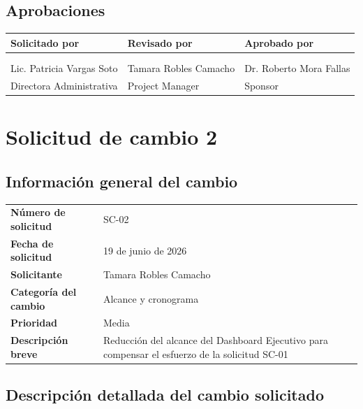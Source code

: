 \documentclass[11pt,spanish]{article}
\begin{document}
\subsection{Aprobaciones}

\begin{table}[H]
\centering
\begin{tabularx}{\textwidth}{Y Y Y}
\toprule
\textbf{Solicitado por} & \textbf{Revisado por} & \textbf{Aprobado por} \\
\midrule
& & \\
& & \\
Lic. Patricia Vargas Soto & Tamara Robles Camacho & Dr. Roberto Mora Fallas \\
Directora Administrativa & Project Manager & Sponsor \\
\bottomrule
\end{tabularx}
\end{table}

\newpage
\section{Solicitud de cambio 2}

\subsection{Información general del cambio}

\begin{table}[H]
\centering
\begin{tabularx}{\textwidth}{p{5cm} Y}
\toprule
\textbf{Número de solicitud} & SC-02 \\
\textbf{Fecha de solicitud} & 19 de junio de 2026 \\
\textbf{Solicitante} & Tamara Robles Camacho \\
\textbf{Categoría del cambio} & Alcance y cronograma \\
\textbf{Prioridad} & Media \\
\textbf{Descripción breve} & Reducción del alcance del Dashboard Ejecutivo para compensar el esfuerzo de la solicitud SC-01 \\
\bottomrule
\end{tabularx}
\end{table}

\subsection{Descripción detallada del cambio solicitado}
\end{document}
